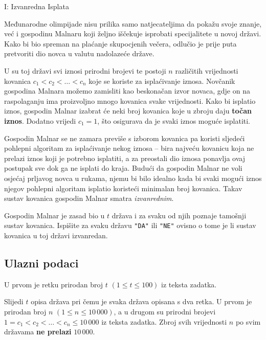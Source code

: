 \begin{statement}[
  timelimit=1 s,
  memorylimit=512 MiB,
]{I: Izvanredna Isplata}

Međunarodne olimpijade nisu prilika samo natjecateljima da pokažu svoje znanje,
već i gospodinu Malnaru koji željno iščekuje isprobati specijalitete u novoj
državi. Kako bi bio spreman na plaćanje skupocjenih večera, odlučio je prije
puta pretvoriti dio novca u valutu nadolazeće države.

U su toj državi svi iznosi prirodni brojevi te postoji $n$ različitih
vrijednosti kovanica $c_1 < c_2 < \dots < c_n$ koje se koriste za
isplaćivanje iznosa. Novčanik gospodina Malnara možemo zamisliti kao
beskonačan izvor novaca, gdje on na raspolaganju ima proizvoljno mnogo
kovanica svake vrijednosti. Kako bi isplatio iznos, gospodin Malnar izabrat
će neki broj kovanica koje u zbroju daju \textbf{točan iznos}. Dodatno
vrijedi $c_1 = 1$, što osigurava da je svaki iznos moguće isplatiti.

Gospodin Malnar se ne zamara previše s izborom kovanica pa koristi sljedeći
pohlepni algoritam za isplaćivanje nekog iznosa -- bira najveću kovanicu koja
ne prelazi iznos koji je potrebno isplatiti, a za preostali dio iznosa
ponavlja ovaj postupak sve dok ga ne isplati do kraja. Budući da gospodin
Malnar ne voli osjećaj prljavog novca u rukama, njemu bi bilo idealno kada bi
svaki mogući iznos njegov pohlepni algoritam isplatio koristeći minimalan
broj kovanica. Takav sustav kovanica gospodin Malnar smatra
\textit{izvanrednim}.

Gospodin Malnar je zasad bio u $t$ država i za svaku od njih poznaje tamošnji
sustav kovanica. Ispišite za svaku državu \texttt{"DA"} ili \texttt{"NE"}
ovisno o tome je li sustav kovanica u toj državi izvanredan.

\subsection*{Ulazni podaci}
U prvom je retku prirodan broj $t$ $(1 \le t \le 100)$ iz teksta zadatka.

Slijedi $t$ opisa država pri čemu je svaka država opisana s dva retka. U prvom
je prirodan broj $n$ $(1 \le n \le 10\,000)$, a u drugom su
prirodni brojevi $1 = c_1 < c_2 < \dots < c_n \le 10\,000$ iz teksta zadatka.
Zbroj svih vrijednosti $n$ po svim državama \textbf{ne prelazi} $10\,000$.


\end{statement}
